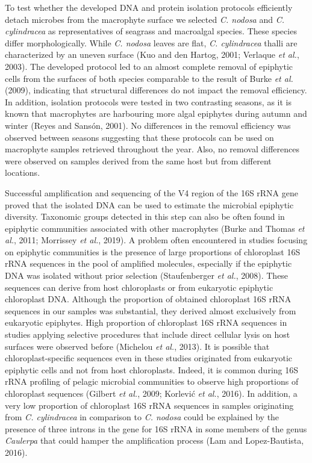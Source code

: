 \documentclass[12pt,]{article}
\begin{document}
To test whether the developed DNA and protein isolation protocols
efficiently detach microbes from the macrophyte surface we selected
\emph{C. nodosa} and \emph{C. cylindracea} as representatives of
seagrass and macroalgal species. These species differ morphologically.
While \emph{C. nodosa} leaves are flat, \emph{C. cylindracea} thalli are
characterized by an uneven surface (Kuo and den Hartog, 2001; Verlaque
\emph{et al.}, 2003). The developed protocol led to an almost complete
removal of epiphytic cells from the surfaces of both species comparable
to the result of Burke \emph{et al.} (2009), indicating that structural
differences do not impact the removal efficiency. In addition, isolation
protocols were tested in two contrasting seasons, as it is known that
macrophytes are harbouring more algal epiphytes during autumn and winter
(Reyes and Sansón, 2001). No differences in the removal efficiency was
observed between seasons suggesting that these protocols can be used on
macrophyte samples retrieved throughout the year. Also, no removal
differences were observed on samples derived from the same host but from
different locations.

Successful amplification and sequencing of the V4 region of the 16S rRNA
gene proved that the isolated DNA can be used to estimate the microbial
epiphytic diversity. Taxonomic groups detected in this step can also be
often found in epiphytic communities associated with other macrophytes
(Burke and Thomas \emph{et al.}, 2011; Morrissey \emph{et al.}, 2019). A
problem often encountered in studies focusing on epiphytic communities
is the presence of large proportions of chloroplast 16S rRNA sequences
in the pool of amplified molecules, especially if the epiphytic DNA was
isolated without prior selection (Staufenberger \emph{et al.}, 2008).
These sequences can derive from host chloroplasts or from eukaryotic
epiphytic chloroplast DNA. Although the proportion of obtained
chloroplast 16S rRNA sequences in our samples was substantial, they
derived almost exclusively from eukaryotic epiphytes. High proportion of
chloroplast 16S rRNA sequences in studies applying selective procedures
that include direct cellular lysis on host surfaces were observed before
(Michelou \emph{et al.}, 2013). It is possible that chloroplast-specific
sequences even in these studies originated from eukaryotic epiphytic
cells and not from host chloroplasts. Indeed, it is common during 16S
rRNA profiling of pelagic microbial communities to observe high
proportions of chloroplast sequences (Gilbert \emph{et al.}, 2009;
Korlević \emph{et al.}, 2016). In addition, a very low proportion of
chloroplast 16S rRNA sequences in samples originating from \emph{C.
cylindracea} in comparison to \emph{C. nodosa} could be explained by the
presence of three introns in the gene for 16S rRNA in some members of
the genus \emph{Caulerpa} that could hamper the amplification process
(Lam and Lopez-Bautista, 2016).
\end{document}
